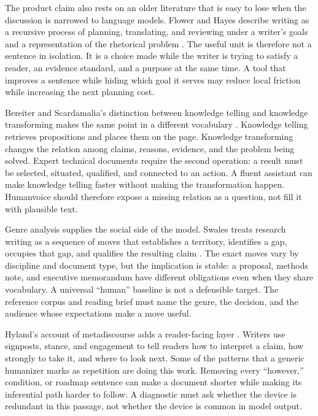 The product claim also rests on an older literature that is easy to lose when
the discussion is narrowed to language models. Flower and Hayes describe
writing as a recursive process of planning, translating, and reviewing under a
writer's goals and a representation of the rhetorical problem
\citep{flower1981cognitive}. The useful unit is therefore not a sentence in
isolation. It is a choice made while the writer is trying to satisfy a reader,
an evidence standard, and a purpose at the same time. A tool that improves a
sentence while hiding which goal it serves may reduce local friction while
increasing the next planning cost.

Bereiter and Scardamalia's distinction between knowledge telling and knowledge
transforming makes the same point in a different vocabulary
\citep{bereiter1987psychology}. Knowledge telling retrieves propositions and
places them on the page. Knowledge transforming changes the relation among
claims, reasons, evidence, and the problem being solved. Expert technical
documents require the second operation: a result must be selected, situated,
qualified, and connected to an action. A fluent assistant can make knowledge
telling faster without making the transformation happen. Humanvoice should
therefore expose a missing relation as a question, not fill it with plausible
text.

Genre analysis supplies the social side of the model. Swales treats research
writing as a sequence of moves that establishes a territory, identifies a
gap, occupies that gap, and qualifies the resulting claim
\citep{swales1990genre}. The exact moves vary by discipline and document type,
but the implication is stable: a proposal, methods note, and executive
memorandum have different obligations even when they share vocabulary. A
universal ``human'' baseline is not a defensible target. The reference corpus
and reading brief must name the genre, the decision, and the audience whose
expectations make a move useful.

Hyland's account of metadiscourse adds a reader-facing layer
\citep{hyland2005metadiscourse}. Writers use signposts, stance, and
engagement to tell readers how to interpret a claim, how strongly to take it,
and where to look next. Some of the patterns that a generic humanizer marks as
repetition are doing this work. Removing every ``however,'' condition, or
roadmap sentence can make a document shorter while making its inferential
path harder to follow. A diagnostic must ask whether the device is redundant
in this passage, not whether the device is common in model output.

